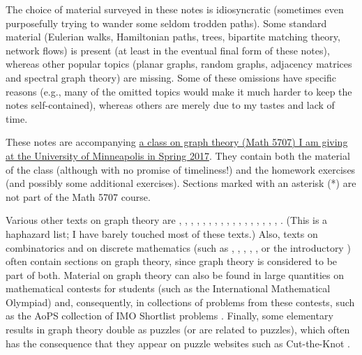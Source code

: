 \documentclass[numbers=enddot,12pt,final,onecolumn,notitlepage]{scrartcl}%
\theoremstyle{definition}
\begin{document}
The choice of material surveyed in these notes is idiosyncratic
(sometimes even purposefully trying to wander some seldom trodden
paths). Some standard material (Eulerian walks, Hamiltonian paths,
trees, bipartite matching theory, network flows) is present (at least
in the eventual final form of these notes), whereas
other popular topics (planar graphs, random graphs, adjacency matrices
and spectral graph theory) are missing. Some of these omissions have
specific reasons (e.g., many of the omitted topics would make it much
harder to keep the notes self-contained), whereas others are merely
due to my tastes and lack of time.

These notes are accompanying
\href{http://www.math.umn.edu/~dgrinber/5707s17/}{a
class on graph theory (Math 5707) I am giving at the University of
Minneapolis in Spring 2017}. They contain both the
material of the class (although with no promise of timeliness!) and the
homework exercises (and possibly some additional exercises).
Sections marked with an asterisk (*) are not part of the Math 5707
course.

Various other texts on graph theory are \cite{Bollob79},
\cite{Bollob98}, \cite{Harary69}, \cite{Harju14}, \cite{Balakr97},
\cite{BonMur76}, \cite{Ore62}, \cite{BehCha71}, \cite{BeChZh15},
\cite{BonMur08}, \cite{Ruohon13}, \cite{Dieste16}, \cite{Ore90},
\cite{HaHiMo08}, \cite{Berge91}, \cite{ChaLes15}, \cite{Griffi15},
\cite{Wilson96}.
(This is a haphazard list; I have barely touched most of these texts.)
Also, texts on combinatorics and on discrete mathematics (such as
\cite{BenWil12}, \cite{KelTro15}, \cite{PoTaWo83}, \cite{Bona11},
\cite{Guicha16},
or the introductory \cite{LoPeVe03}) often contain
sections on graph theory, since graph theory is considered to be part
of both.
Material on graph theory can also be found in large quantities on
mathematical contests for students (such as the International
Mathematical Olympiad) and, consequently, in collections of problems
from these contests, such as the AoPS collection of IMO Shortlist
problems \cite{AoPS-ISL}.
Finally, some elementary results in graph theory double as puzzles
(or are related to puzzles), which often has the consequence that they
appear on puzzle websites such as Cut-the-Knot \cite{cut-the-knot}.
\end{document}
